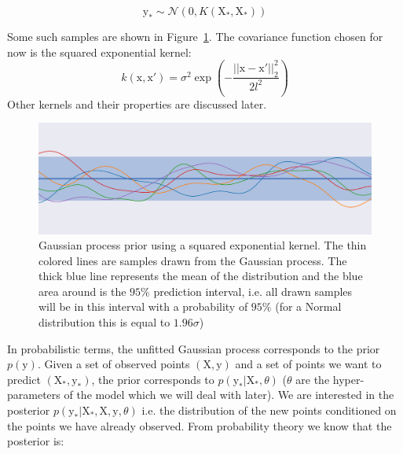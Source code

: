 \begin{equation}
    \mathrm{y_*} \sim \mathcal{N} \left( 0, K(\mathrm{X_*}, \mathrm{X_*})\right)
\end{equation}

Some such samples are shown in Figure~\ref{fig:gp_prior}. The covariance function chosen for now is the squared exponential kernel:
\begin{equation}
	k(\mathrm{x}, \mathrm{x'}) = \sigma^2 \exp\left( -\frac{||\mathrm{x} - \mathrm{x'}||_2^2}{2l^2}\right)
	\label{eq:sqexp}
\end{equation}
Other kernels and their properties are discussed later. 


\begin{figure}[htb]
	\centering
	\includegraphics[width=\linewidth]{img_hyperopt/gp_prior.png}
	\caption{Gaussian process prior using a squared exponential kernel. The thin colored lines are samples drawn from the Gaussian process. The thick blue line represents the mean of the distribution and the blue area around is the $95 \%$ prediction interval, i.e. all drawn samples will be in this interval with a probability of $95 \%$ (for a Normal distribution this is equal to $1.96 \sigma$)}
	\label{fig:gp_prior}
\end{figure}

In probabilistic terms, the unfitted Gaussian process corresponds to the prior $p \left( \mathrm{y} \right)$. Given a set of observed points $(\mathrm{X}, \mathrm{y})$ and a set of points we want to predict $(\mathrm{X_*}, \mathrm{y_*})$, the prior corresponds to $p\left( \mathrm{y_*} | \mathrm{X_*}, \theta \right)$ ($\theta$ are the hyper-parameters of the model which we will deal with later). We are interested in the posterior $p\left( \mathrm{y_*} | \mathrm{X_*}, \mathrm{X}, \mathrm{y}, \theta \right)$ i.e. the distribution of the new points conditioned on the points we have already observed. From probability theory we know that the posterior is:

